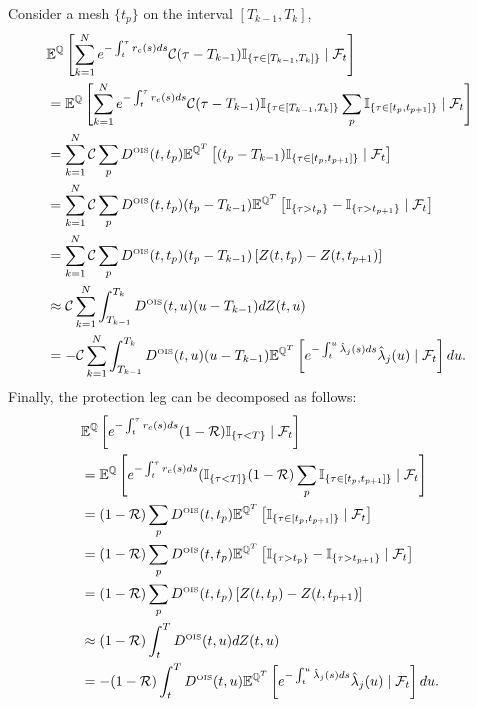 \documentclass[12pt,a4paper]{article}
\theoremstyle{plain}
\numberwithin{equation}{section}
\begin{document}
Consider a mesh $\{t_p\}$ on the interval $[T_{k-1}, T_k]$,
\begin{align}\label{Interest}
&\mathbb{E}^\mathbb{Q}\left[\sum_{k=1}^N e^{-\int_t^{\tau} r_c(s)ds } \mathcal{C}(\tau-T_{k-1})\mathbb{I}_{\{\tau\in [T_{k-1},T_k]\}}\mid \mathcal{F}_t\right]\\
&=\mathbb{E}^\mathbb{Q}\left[\sum_{k=1}^N e^{-\int_t^{\tau} r_c(s)ds } \mathcal{C}(\tau-T_{k-1})\mathbb{I}_{\{\tau\in [T_{k-1},T_k]\}}\sum_p \mathbb{I}_{\{\tau\in [t_p,t_{p+1}]\}}\mid \mathcal{F}_t\right]\nonumber\\ \nonumber
&=\sum_{k=1}^N \mathcal{C}\sum_p D^{\tiny \mbox{OIS}}(t,t_p)\mathbb{E}^{\mathbb{Q}^{T}}\left[(t_p-T_{k-1})\mathbb{I}_{\{\tau\in [t_p,t_{p+1}]\}}\mid \mathcal{F}_t\right]\\ \nonumber
&=\sum_{k=1}^N \mathcal{C}\sum_p D^{\tiny \mbox{OIS}}(t,t_p)(t_p-T_{k-1})\mathbb{E}^{\mathbb{Q}^{T}}\left[\mathbb{I}_{\{\tau>t_p\}}-\mathbb{I}_{\{\tau>t_{p+1}\}}\mid \mathcal{F}_t\right]\\ \nonumber
&=\sum_{k=1}^N \mathcal{C}\sum_p D^{\tiny \mbox{OIS}}(t,t_p)(t_p-T_{k-1})\left[Z(t,t_p)-Z(t,t_{p+1})\right]\\ \nonumber
&\approx \mathcal{C} \sum_{k=1}^N \int_{T_{k-1}}^{T_k} D^{\tiny \mbox{OIS}}(t,u)(u-T_{k-1})dZ(t,u)\\ \nonumber
&=-\mathcal{C} \sum_{k=1}^N \int_{T_{k-1}}^{T_k} D^{\tiny \mbox{OIS}}(t,u)(u-T_{k-1})\mathbb{E}^{\mathbb{Q}^{T}}\left[e^{-\int_t^u \hat{\lambda}_j(s)ds}\hat{\lambda}_j(u)\mid \mathcal{F}_t\right] du.
\end{align}
Finally, the protection leg can be decomposed as follows:
\begin{align}\label{Protection}
&\mathbb{E}^\mathbb{Q}\left[e^{-\int_t^{\tau} r_c(s)ds } (1-\mathcal{R})\mathbb{I}_{\{\tau<T\}}\mid \mathcal{F}_t\right]\\
&=\mathbb{E}^\mathbb{Q}\left[e^{-\int_t^{\tau} r_c(s)ds }(\mathbb{I}_{\{\tau<T]\}}(1-\mathcal{R})\sum_p \mathbb{I}_{\{\tau\in [t_p,t_{p+1}]\}}\mid \mathcal{F}_t\right]\nonumber\\ \nonumber
&=(1-\mathcal{R})\sum_p D^{\tiny \mbox{OIS}}(t,t_p)\mathbb{E}^{\mathbb{Q}^{T}}\left[\mathbb{I}_{\{\tau\in [t_p,t_{p+1}]\}}\mid \mathcal{F}_t\right]\\ \nonumber
&=(1-\mathcal{R})\sum_p D^{\tiny \mbox{OIS}}(t,t_p)\mathbb{E}^{\mathbb{Q}^{T}}\left[\mathbb{I}_{\{\tau>t_p\}}-\mathbb{I}_{\{\tau>t_{p+1}\}}\mid \mathcal{F}_t\right]\\ \nonumber
&=(1-\mathcal{R})\sum_p D^{\tiny \mbox{OIS}}(t,t_p)\left[Z(t,t_p)-Z(t,t_{p+1})\right]\\ \nonumber
&\approx (1-\mathcal{R})\int_{t}^{T} D^{\tiny \mbox{OIS}}(t,u) dZ(t,u)\\ \nonumber
&= -(1-\mathcal{R})\int_{t}^{T} D^{\tiny \mbox{OIS}}(t,u)\mathbb{E}^{\mathbb{Q}^{T}}\left[e^{-\int_t^u \hat{\lambda}_j(s)ds}\hat{\lambda}_j(u)\mid \mathcal{F}_t\right]du.
\end{align}
\end{document}
